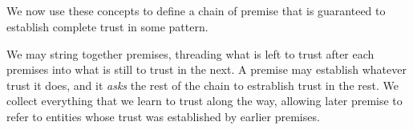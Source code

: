 {\begin{code}
\AgdaSymbol{)}\AgdaSpace{}%
\<%
\\
\>[0]\AgdaSpace{}%
%
\>[8]\AgdaSpace{}%
\AgdaSpace{}%
\AgdaSymbol{=}\AgdaSpace{}%
\AgdaSpace{}%
\<%
\\
\>[0]\AgdaSymbol{(}\AgdaSpace{}%
\AgdaSpace{}%
\AgdaSymbol{)}\AgdaSpace{}%
\AgdaSpace{}%
\AgdaSpace{}%
\AgdaSymbol{=}\AgdaSpace{}%
\AgdaSymbol{(}\AgdaSpace{}%
\AgdaSpace{}%
\AgdaSymbol{)}\AgdaSpace{}%
\AgdaSpace{}%
\AgdaSymbol{(}\AgdaSpace{}%
\AgdaSpace{}%
\AgdaSymbol{)}\<%
\\
\>[0]\AgdaSpace{}%
%
\>[8]\AgdaSpace{}%
\AgdaSpace{}%
\AgdaSymbol{=}\AgdaSpace{}%
\AgdaSpace{}%
\AgdaSymbol{(}\AgdaSpace{}%
\AgdaSpace{}%
\AgdaSymbol{)}\<%
\\
\>[0]%
\>[8]\AgdaSpace{}%
\AgdaSpace{}%
\AgdaSymbol{=}\AgdaSpace{}%
\<%
\end{code}
}

We now use these concepts to define a chain of premise that is guaranteed to
establish complete trust in some pattern.

We may string together premises, threading what is left to trust
after each premises into what is still to trust in the next. A premise may
establish whatever trust it does, and it \emph{asks} the rest of the chain
to estrablish trust in the rest. We collect everything that we learn to
trust along the way, allowing later premise to refer to entities whose
trust was established by earlier premises.


